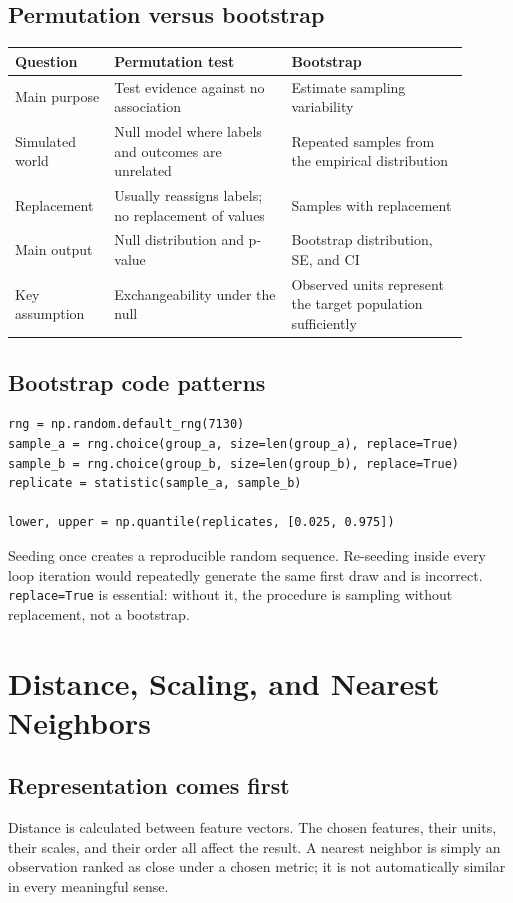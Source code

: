\documentclass[11pt]{article}
\begin{document}
\subsection{Permutation versus bootstrap}
\begin{center}
\small
\begin{tabular}{p{0.18\linewidth} p{0.36\linewidth} p{0.36\linewidth}}
\toprule
\textbf{Question} & \textbf{Permutation test} & \textbf{Bootstrap} \\
\midrule
Main purpose & Test evidence against no association & Estimate sampling variability \\
Simulated world & Null model where labels and outcomes are unrelated & Repeated samples from the empirical distribution \\
Replacement & Usually reassigns labels; no replacement of values & Samples with replacement \\
Main output & Null distribution and p-value & Bootstrap distribution, SE, and CI \\
Key assumption & Exchangeability under the null & Observed units represent the target population sufficiently \\
\bottomrule
\end{tabular}
\end{center}

\subsection{Bootstrap code patterns}
\begin{lstlisting}
rng = np.random.default_rng(7130)
sample_a = rng.choice(group_a, size=len(group_a), replace=True)
sample_b = rng.choice(group_b, size=len(group_b), replace=True)
replicate = statistic(sample_a, sample_b)

lower, upper = np.quantile(replicates, [0.025, 0.975])
\end{lstlisting}
Seeding once creates a reproducible random sequence. Re-seeding inside every loop iteration would repeatedly generate the same first draw and is incorrect. \texttt{replace=True} is essential: without it, the procedure is sampling without replacement, not a bootstrap.

\section{Distance, Scaling, and Nearest Neighbors}
\subsection{Representation comes first}
Distance is calculated between feature vectors. The chosen features, their units, their scales, and their order all affect the result. A nearest neighbor is simply an observation ranked as close under a chosen metric; it is not automatically similar in every meaningful sense.
\end{document}
